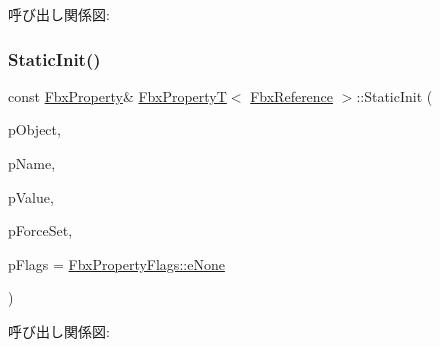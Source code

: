 呼び出し関係図\+:
\mbox{\label{class_fbx_property_t_3_01_fbx_reference_01_4_ae40af651436b9b3df5bbb049e512421d}} 
\subsubsection{\texorpdfstring{Static\+Init()}{StaticInit()}\hspace{0.1cm}{\footnotesize\ttfamily [1/2]}}
{\footnotesize\ttfamily const \hyperlink{class_fbx_property}{Fbx\+Property}\& \hyperlink{class_fbx_property_t}{Fbx\+PropertyT}$<$ \hyperlink{fbxtypes_8h_a44df6a2eec915cf27cd481e5c5e48a24}{Fbx\+Reference} $>$\+::Static\+Init (\begin{DoxyParamCaption}\item[{\hyperlink{class_fbx_object}{Fbx\+Object} $\ast$}]{p\+Object,  }\item[{const char $\ast$}]{p\+Name,  }\item[{const \hyperlink{fbxtypes_8h_a44df6a2eec915cf27cd481e5c5e48a24}{Fbx\+Reference} \&}]{p\+Value,  }\item[{bool}]{p\+Force\+Set,  }\item[{\hyperlink{class_fbx_property_flags_afabfa7e0949aac8a7dcdf8a141867e99}{Fbx\+Property\+Flags\+::\+E\+Flags}}]{p\+Flags = {\ttfamily \hyperlink{class_fbx_property_flags_afabfa7e0949aac8a7dcdf8a141867e99ac1b9aab93d40af76eb419be426de17b1}{Fbx\+Property\+Flags\+::e\+None}} }\end{DoxyParamCaption})}

呼び出し関係図\+:
\mbox{\label{class_fbx_property_t_3_01_fbx_reference_01_4_ae6f72c54ae167513f7975c56bfeb0281}} 
